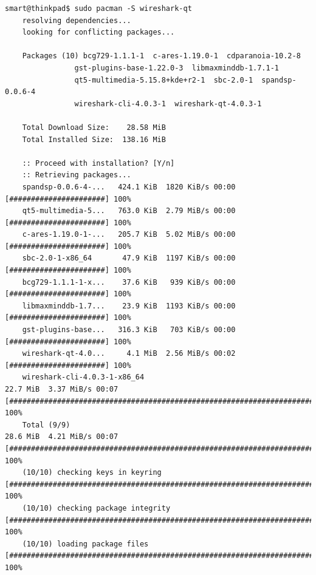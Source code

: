 \begin{Verbatim}[frame=single]
    smart@thinkpad$ sudo pacman -S wireshark-qt
    resolving dependencies...
    looking for conflicting packages...

    Packages (10) bcg729-1.1.1-1  c-ares-1.19.0-1  cdparanoia-10.2-8
                gst-plugins-base-1.22.0-3  libmaxminddb-1.7.1-1
                qt5-multimedia-5.15.8+kde+r2-1  sbc-2.0-1  spandsp-0.0.6-4
                wireshark-cli-4.0.3-1  wireshark-qt-4.0.3-1

    Total Download Size:    28.58 MiB
    Total Installed Size:  138.16 MiB

    :: Proceed with installation? [Y/n] 
    :: Retrieving packages...
    spandsp-0.0.6-4-...   424.1 KiB  1820 KiB/s 00:00 [######################] 100%
    qt5-multimedia-5...   763.0 KiB  2.79 MiB/s 00:00 [######################] 100%
    c-ares-1.19.0-1-...   205.7 KiB  5.02 MiB/s 00:00 [######################] 100%
    sbc-2.0-1-x86_64       47.9 KiB  1197 KiB/s 00:00 [######################] 100%
    bcg729-1.1.1-1-x...    37.6 KiB   939 KiB/s 00:00 [######################] 100%
    libmaxminddb-1.7...    23.9 KiB  1193 KiB/s 00:00 [######################] 100%
    gst-plugins-base...   316.3 KiB   703 KiB/s 00:00 [######################] 100%
    wireshark-qt-4.0...     4.1 MiB  2.56 MiB/s 00:02 [######################] 100%
    wireshark-cli-4.0.3-1-x86_64                                                                                       22.7 MiB  3.37 MiB/s 00:07 [########################################################################################] 100%
    Total (9/9)                                                                                                        28.6 MiB  4.21 MiB/s 00:07 [########################################################################################] 100%
    (10/10) checking keys in keyring                                                                                                               [########################################################################################] 100%
    (10/10) checking package integrity                                                                                                             [########################################################################################] 100%
    (10/10) loading package files                                                                                                                  [########################################################################################] 100%

\end{Verbatim}
